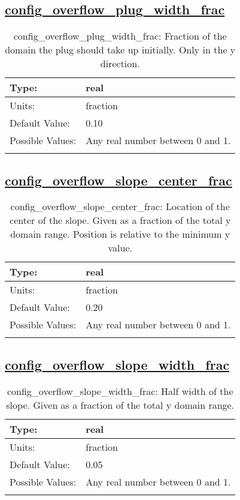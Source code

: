 \subsection[config\_overflow\_plug\_width\_frac]{\hyperref[sec:nm_tab_overflow]{config\_overflow\_plug\_width\_frac}}
\label{subsec:nm_sec_config_overflow_plug_width_frac}
\begin{center}
\begin{longtable}{| p{2.0in} || p{4.0in} |}
    \hline
    Type: & real \\
    \hline
    Units: & \si{fraction} \\
    \hline
    Default Value: & 0.10 \\
    \hline
    Possible Values: & Any real number between 0 and 1. \\
    \hline
    \caption{config\_overflow\_plug\_width\_frac: Fraction of the domain the plug should take up initially. Only in the y direction.}
\end{longtable}
\end{center}
\subsection[config\_overflow\_slope\_center\_frac]{\hyperref[sec:nm_tab_overflow]{config\_overflow\_slope\_center\_frac}}
\label{subsec:nm_sec_config_overflow_slope_center_frac}
\begin{center}
\begin{longtable}{| p{2.0in} || p{4.0in} |}
    \hline
    Type: & real \\
    \hline
    Units: & \si{fraction} \\
    \hline
    Default Value: & 0.20 \\
    \hline
    Possible Values: & Any real number between 0 and 1. \\
    \hline
    \caption{config\_overflow\_slope\_center\_frac: Location of the center of the slope. Given as a fraction of the total y domain range. Position is relative to the minimum y value.}
\end{longtable}
\end{center}
\subsection[config\_overflow\_slope\_width\_frac]{\hyperref[sec:nm_tab_overflow]{config\_overflow\_slope\_width\_frac}}
\label{subsec:nm_sec_config_overflow_slope_width_frac}
\begin{center}
\begin{longtable}{| p{2.0in} || p{4.0in} |}
    \hline
    Type: & real \\
    \hline
    Units: & \si{fraction} \\
    \hline
    Default Value: & 0.05 \\
    \hline
    Possible Values: & Any real number between 0 and 1. \\
    \hline
    \caption{config\_overflow\_slope\_width\_frac: Half width of the slope. Given as a fraction of the total y domain range.}
\end{longtable}
\end{center}
